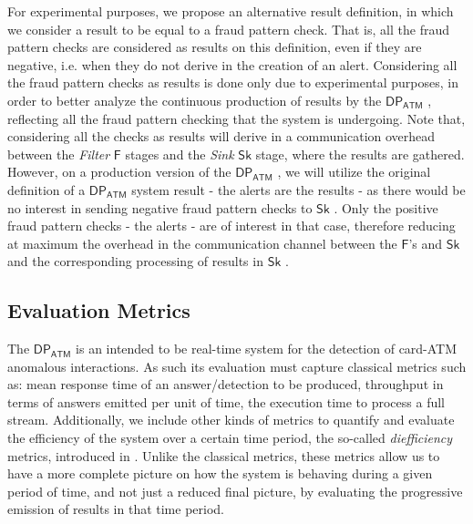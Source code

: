 \documentclass[12pt,a4paper]{article}
\newcommand{\DPATM}{$\mathsf{DP_{ATM}}$ }
\newcommand{\filter}{\emph{Filter} }
\newcommand{\sink}{\emph{Sink} }
\newcommand{\F}{$\mathsf{F}$ }
\newcommand{\Sk}{$\mathsf{Sk}$ }
\begin{document}
For experimental purposes, we propose an alternative result definition, in which we consider a result to be equal to a fraud pattern check. That is, all the fraud pattern checks are considered as results on this definition, even if they are negative, i.e. when they do not derive in the creation of an alert. Considering all the fraud pattern checks as results is done only due to experimental purposes, in order to better analyze the continuous production of results by the \DPATM, reflecting all the fraud pattern checking that the system is undergoing. Note that, considering all the checks as results will derive in a communication overhead between the \filter \F stages and the \sink \Sk stage, where the results are gathered. However, on a production version of the \DPATM, we will utilize the original definition of a \DPATM system result - the alerts are the results - as there would be no interest in sending negative fraud pattern checks to \Sk. Only the positive fraud pattern checks - the alerts - are of interest in that case, therefore reducing at maximum the overhead in the communication channel between the $\mathsf{F}$'s and \Sk and the corresponding processing of results in \Sk.

\subsection{Evaluation Metrics}\label{exps:evaluation-metrics}

The \DPATM is an intended to be real-time system for the detection of card-ATM anomalous interactions. As such its evaluation must capture classical metrics such as: mean response time of an answer/detection to be produced, throughput in terms of answers emitted per unit of time, the execution time to process a full stream. 
Additionally, we include other kinds of metrics to quantify and evaluate the efficiency of the system over a certain time period, the so-called \emph{diefficiency} metrics, introduced in \cite{exps-diefficiency}. Unlike the classical metrics, these metrics allow us to have a more complete picture on how the system is behaving during a given period of time, and not just a reduced final picture, by evaluating the progressive emission of results in that time period.
\end{document}
